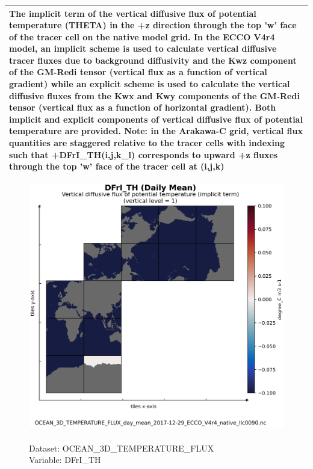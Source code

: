\begin{longtable}{|p{}|p{}|p{}|p{}|}
\multicolumn{4}{|p{1\textwidth}|}{The implicit term of the vertical diffusive flux of potential temperature (THETA) in the +z direction through the top 'w' face of the tracer cell on the native model grid. In the ECCO V4r4 model, an implicit scheme is used to calculate vertical diffusive tracer fluxes due to background diffusivity and the Kwz component of the GM-Redi tensor (vertical flux as a function of vertical gradient) while an explicit scheme is used to calculate the vertical diffusive fluxes from the Kwx and Kwy components of the GM-Redi tensor (vertical flux as a function of horizontal gradient). Both implicit and explicit components of vertical diffusive flux of potential temperature are provided. Note: in the Arakawa-C grid, vertical flux quantities are staggered relative to the tracer cells with indexing such that +DFrI\_TH(i,j,k\_l) corresponds to upward +z fluxes through the top 'w' face of the tracer cell at (i,j,k)} \\ \hline
\end{longtable}

\begin{figure}[H]
\centering
\includegraphics[scale=0.5]{../images/plots/native_plots/Ocean_Three-Dimensional_Potential_Temperature_Fluxes/DFrI_TH.png}
\caption{\\Dataset: OCEAN\_3D\_TEMPERATURE\_FLUX\\Variable: DFrI\_TH}
\label{tab:table-OCEAN_3D_TEMPERATURE_FLUX_DFrI_TH-Plot}
\end{figure}
\pagebreak
